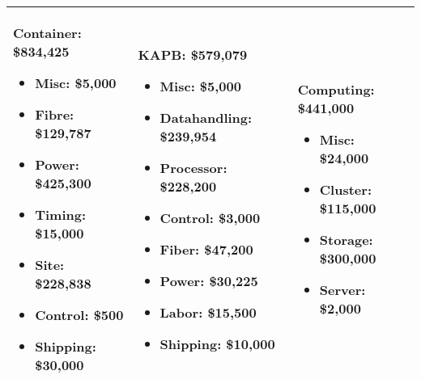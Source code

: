 \begin{table}[t]
\begin{tabular}{| p{2in} | p{2in} | p{2in} | }
\\ \hline
\noindent
\textbf{Container:}  \$834,425
\vspace{-0.1in}
\begin{itemize}[parsep=-2pt, itemsep=-3pt]
\item Misc:   \$5,000
\item Fibre:   \$129,787
\item Power:   \$425,300
\item Timing:   \$15,000
\item Site:   \$228,838
\item Control:   \$500
\item Shipping:   \$30,000
\vspace{-.1in}
\end{itemize}
 &
 \noindent
\textbf{KAPB:}  \$579,079
\vspace{-0.1in}
\begin{itemize}[parsep=-2pt, itemsep=-3pt]
\item Misc:   \$5,000
\item Datahandling:   \$239,954
\item Processor:   \$228,200
\item Control:   \$3,000
\item Fiber:   \$47,200
\item Power:   \$30,225
\item Labor:   \$15,500
\item Shipping:   \$10,000
\vspace{-.1in}
\end{itemize}
 &
 \noindent
\textbf{Computing:}  \$441,000
\vspace{-0.1in}
\begin{itemize}[parsep=-2pt, itemsep=-3pt]
\item Misc:   \$24,000
\item Cluster:   \$115,000
\item Storage:   \$300,000
\item Server:   \$2,000
\vspace{-.1in}
\end{itemize}
\\ \hline
\end{tabular}
\end{table}
